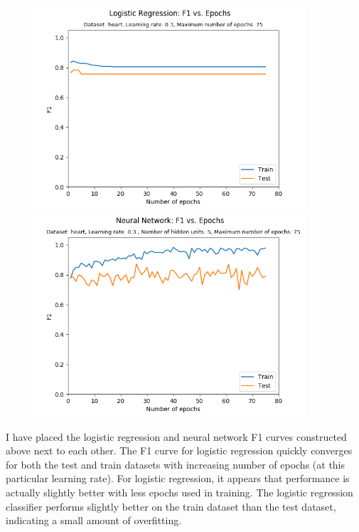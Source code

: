 \documentclass{article}
\newenvironment{soln}{
	\leavevmode\color{blue}\ignorespaces
}{}
\begin{document}
\begin{enumerate}
\begin{soln}
\begin{figure}[h]
    \centering
    \begin{minipage}{0.5\textwidth}
        \centering
        \includegraphics[width=0.9\textwidth]{figs/logistic_f1_curve} 
    \end{minipage}\hfill
    \begin{minipage}{0.5\textwidth}
        \centering
        \includegraphics[width=0.9\textwidth]{figs/nnet_f1_curve} 
    \end{minipage}
\end{figure}

I have placed the logistic regression and neural network F1 curves constructed above next to each other. The F1 curve for logistic regression quickly converges for both the test and train datasets with increasing number of epochs (at this particular learning rate). For logistic regression, it appears that performance is actually slightly better with less epochs used in training. The logistic regression classifier performs slightly better on the train dataset than the test dataset, indicating a small amount of overfitting. 


\end{soln}
\end{enumerate}
\end{document}
